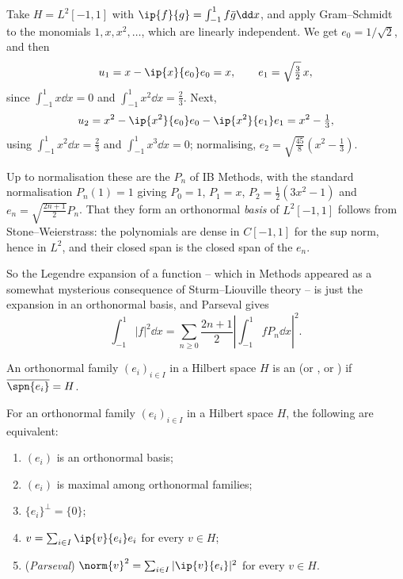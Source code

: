 \begin{example}
	Take $H = L^2[-1,1]$ with $\ip{f}{g}=\int_{-1}^1 f\bar g\dd x$, and apply Gram--Schmidt to the monomials $1, x, x^2, \dots$, which are linearly independent. We get $e_0 = 1/\sqrt2$, and then
	$$u_1 = x - \ip{x}{e_0}e_0 = x, \qquad e_1 = \sqrt{\tfrac32}\,x,$$
	since $\int_{-1}^1 x \dd x = 0$ and $\int_{-1}^1x^2\dd x = \frac23$. Next,
	$$u_2 = x^2 - \ip{x^2}{e_0}e_0 - \ip{x^2}{e_1}e_1 = x^2 - \tfrac13,$$
	using $\int_{-1}^1x^2\dd x = \frac23$ and $\int_{-1}^1 x^3\dd x = 0$; normalising, $e_2 = \sqrt{\frac{45}{8}}(x^2-\frac13)$.

	Up to normalisation these are the  $P_n$ of IB Methods, with the standard normalisation $P_n(1)=1$ giving $P_0=1$, $P_1=x$, $P_2 = \frac12(3x^2-1)$ and $e_n = \sqrt{\frac{2n+1}{2}}P_n$. That they form an orthonormal \emph{basis} of $L^2[-1,1]$ follows from Stone--Weierstrass: the polynomials are dense in $C[-1,1]$ for the sup norm, hence in $L^2$, and their closed span is the closed span of the $e_n$.

	So the Legendre expansion of a function -- which in Methods appeared as a somewhat mysterious consequence of Sturm--Liouville theory -- is just the expansion in an orthonormal basis, and Parseval gives
	$$\int_{-1}^1|f|^2\dd x = \sum_{n\geq0}\frac{2n+1}{2}\left|\int_{-1}^1 f P_n \dd x\right|^2.$$
\end{example}

\begin{definition}
	An orthonormal family $(e_i)_{i \in I}$ in a Hilbert space $H$ is an  (or , or ) if $\overline{\spn\{e_i\}} = H$.
\end{definition}

\begin{proposition}
	For an orthonormal family $(e_i)_{i\in I}$ in a Hilbert space $H$, the following are equivalent:
	\begin{enumerate}[label=(\roman*)]
		\item $(e_i)$ is an orthonormal basis;
		\item $(e_i)$ is maximal among orthonormal families;
		\item $\{e_i\}^\perp = \{0\}$;
		\item $v = \sum_{i \in I}\ip{v}{e_i}e_i$ for every $v \in H$;
		\item (\emph{Parseval}) $\norm{v}^2 = \sum_{i \in I}|\ip{v}{e_i}|^2$ for every $v \in H$.
	\end{enumerate}
\end{proposition}


